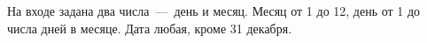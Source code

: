 На входе задана два числа~---~день и месяц. Месяц от 1 до 12, день от 1 до числа дней в месяце. Дата любая, кроме 31 декабря.